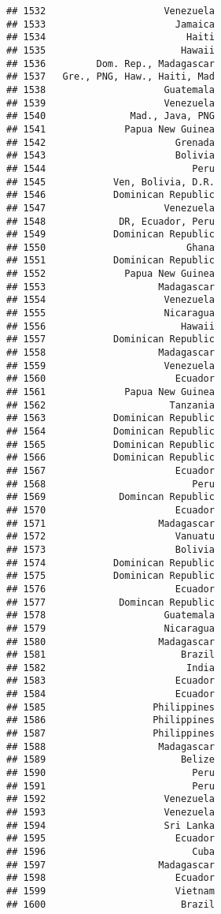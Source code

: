 \documentclass[
]{article}
\begin{document}
\begin{verbatim}
## 1532                     Venezuela
## 1533                       Jamaica
## 1534                         Haiti
## 1535                        Hawaii
## 1536         Dom. Rep., Madagascar
## 1537   Gre., PNG, Haw., Haiti, Mad
## 1538                     Guatemala
## 1539                     Venezuela
## 1540               Mad., Java, PNG
## 1541              Papua New Guinea
## 1542                       Grenada
## 1543                       Bolivia
## 1544                          Peru
## 1545            Ven, Bolivia, D.R.
## 1546            Dominican Republic
## 1547                     Venezuela
## 1548             DR, Ecuador, Peru
## 1549            Dominican Republic
## 1550                         Ghana
## 1551            Dominican Republic
## 1552              Papua New Guinea
## 1553                    Madagascar
## 1554                     Venezuela
## 1555                     Nicaragua
## 1556                        Hawaii
## 1557            Dominican Republic
## 1558                    Madagascar
## 1559                     Venezuela
## 1560                       Ecuador
## 1561              Papua New Guinea
## 1562                      Tanzania
## 1563            Dominican Republic
## 1564            Dominican Republic
## 1565            Dominican Republic
## 1566            Dominican Republic
## 1567                       Ecuador
## 1568                          Peru
## 1569             Domincan Republic
## 1570                       Ecuador
## 1571                    Madagascar
## 1572                       Vanuatu
## 1573                       Bolivia
## 1574            Dominican Republic
## 1575            Dominican Republic
## 1576                       Ecuador
## 1577             Domincan Republic
## 1578                     Guatemala
## 1579                     Nicaragua
## 1580                    Madagascar
## 1581                        Brazil
## 1582                         India
## 1583                       Ecuador
## 1584                       Ecuador
## 1585                   Philippines
## 1586                   Philippines
## 1587                   Philippines
## 1588                    Madagascar
## 1589                        Belize
## 1590                          Peru
## 1591                          Peru
## 1592                     Venezuela
## 1593                     Venezuela
## 1594                     Sri Lanka
## 1595                       Ecuador
## 1596                          Cuba
## 1597                    Madagascar
## 1598                       Ecuador
## 1599                       Vietnam
## 1600                        Brazil

\end{verbatim}
\end{document}
